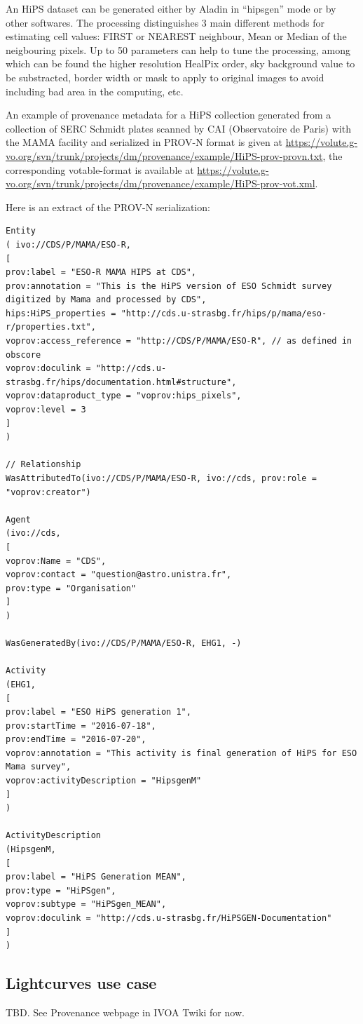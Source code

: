 An HiPS dataset can be generated either by Aladin in ``hipsgen'' mode or by other softwares.  The processing distinguishes 3 main different methods for estimating cell values: FIRST or NEAREST neighbour, Mean or Median of the neigbouring pixels. Up to 50 parameters can help to tune the processing, among which can be found the higher resolution HealPix order, sky background value to be substracted, border width or mask to apply to original images to avoid including bad area in the computing, etc.

An example of provenance metadata for a HiPS collection generated from a collection of SERC Schmidt plates scanned by CAI (Observatoire de Paris) with the MAMA facility and serialized in PROV-N format is given at 
\url{https://volute.g-vo.org/svn/trunk/projects/dm/provenance/example/HiPS-prov-provn.txt}, the corresponding votable-format is available at \url{https://volute.g-vo.org/svn/trunk/projects/dm/provenance/example/HiPS-prov-vot.xml}.

Here is an extract of the PROV-N serialization:

\begin{verbatim}
Entity
( ivo://CDS/P/MAMA/ESO-R, 
[
prov:label = "ESO-R MAMA HIPS at CDS",
prov:annotation = "This is the HiPS version of ESO Schmidt survey digitized by Mama and processed by CDS",
hips:HiPS_properties = "http://cds.u-strasbg.fr/hips/p/mama/eso-r/properties.txt",
voprov:access_reference = "http://CDS/P/MAMA/ESO-R", // as defined in obscore 
voprov:doculink = "http://cds.u-strasbg.fr/hips/documentation.html#structure",
voprov:dataproduct_type = "voprov:hips_pixels",
voprov:level = 3
]
)

// Relationship
WasAttributedTo(ivo://CDS/P/MAMA/ESO-R, ivo://cds, prov:role = "voprov:creator")

Agent
(ivo://cds,
[
voprov:Name = "CDS",
voprov:contact = "question@astro.unistra.fr",
prov:type = "Organisation"
]
) 

WasGeneratedBy(ivo://CDS/P/MAMA/ESO-R, EHG1, -)

Activity
(EHG1,
[
prov:label = "ESO HiPS generation 1",
prov:startTime = "2016-07-18",
prov:endTime = "2016-07-20",
voprov:annotation = "This activity is final generation of HiPS for ESO Mama survey",
voprov:activityDescription = "HipsgenM"
]
)

ActivityDescription 
(HipsgenM,
[
prov:label = "HiPS Generation MEAN",
prov:type = "HiPSgen",
voprov:subtype = "HiPSgen_MEAN",
voprov:doculink = "http://cds.u-strasbg.fr/HiPSGEN-Documentation"
]
)
\end{verbatim}


\subsection{Lightcurves use case}
TBD. See Provenance webpage in IVOA Twiki for now.
